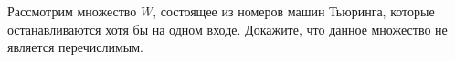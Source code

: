 Рассмотрим множество $W$, состоящее из номеров машин Тьюринга, которые останавливаются хотя бы на одном входе. Докажите, что
данное множество не является перечислимым.
